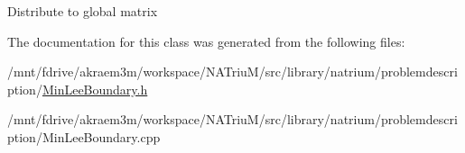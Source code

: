 Distribute to global matrix 

The documentation for this class was generated from the following files:\begin{DoxyCompactItemize}
\item 
/mnt/fdrive/akraem3m/workspace/NATriuM/src/library/natrium/problemdescription/\hyperlink{MinLeeBoundary_8h}{MinLeeBoundary.h}\item 
/mnt/fdrive/akraem3m/workspace/NATriuM/src/library/natrium/problemdescription/MinLeeBoundary.cpp\end{DoxyCompactItemize}
